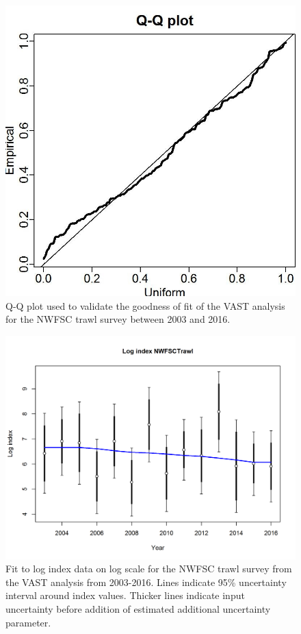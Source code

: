 \documentclass[12pt,]{article}
\begin{document}
\begin{figure}[htbp]
\centering
\includegraphics{Figures/NWFSCtrawl_QQ.jpg}
\caption{Q-Q plot used to validate the goodness of fit of the VAST
analysis for the NWFSC trawl survey between 2003 and 2016.
\label{fig:NWFSCtrawl_QQ}}
\end{figure}

\begin{figure}[htbp]
\centering
\includegraphics{r4ss/plots_mod1/index5_logcpuefit_NWFSCtrawl.png}
\caption{Fit to log index data on log scale for the NWFSC trawl survey
from the VAST analysis from 2003-2016. Lines indicate 95\% uncertainty
interval around index values. Thicker lines indicate input uncertainty
before addition of estimated additional uncertainty parameter.
\label{fig:NWFSCtrawl_indexfit}}
\end{figure}
\end{document}
